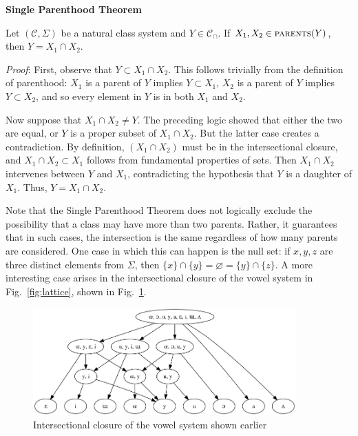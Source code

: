\documentclass[11pt, oneside]{article}   	%
\begin{document}
\vspace{\baselineskip} \noindent \textbf{Single Parenthood Theorem}

Let $(\mathcal C, \Sigma)$ be a natural class system and $Y \in \mathcal C_\cap$. If $X_1, X_2 \in \textsc{parents}(Y)$, then $Y = X_1 \cap X_2$.

\vspace{\baselineskip} \noindent \textit{Proof}: First, observe that $Y \subset X_1 \cap X_2$. This follows trivially from the definition of parenthood: $X_1$ is a parent of $Y$ implies $Y \subset X_1$, $X_2$ is a parent of $Y$ implies $Y \subset X_2$, and so every element in $Y$ is in both $X_1$ and $X_2$.

Now suppose that $X_1 \cap X_2 \neq Y$. The preceding logic showed that either the two are equal, or $Y$ is a proper subset of  $X_1 \cap X_2$. But the latter case creates a contradiction. By definition, $(X_1 \cap X_2)$ must be in the intersectional closure, and $X_1 \cap X_2 \subset X_1$ follows from fundamental properties of sets. Then $X_1 \cap X_2$ intervenes between $Y$ and $X_1$, contradicting the hypothesis that $Y$ is a daughter of $X_1$. Thus, $Y = X_1 \cap X_2$.
	
\vspace{\baselineskip} Note that the Single Parenthood Theorem does not logically exclude the possibility that a class may have more than two parents. Rather, it guarantees that in such cases, the intersection is the same regardless of how many parents are considered. One case in which this can happen is the null set: if $x, y, z$ are three distinct elements from $\Sigma$, then $\{ x \} \cap \{ y \} = \varnothing = \{ y \} \cap \{ z \}$. A more interesting case arises in the intersectional closure of the vowel system in Fig.~\ref{fig:lattice}, shown in Fig.~\ref{fig:closure}. 

\begin{figure}[h]
\includegraphics[width=0.9\textwidth]{vowelHarmony_closure.png}
\caption{Intersectional closure of the vowel system shown earlier}
\label{fig:closure}
\end{figure}
\end{document}
